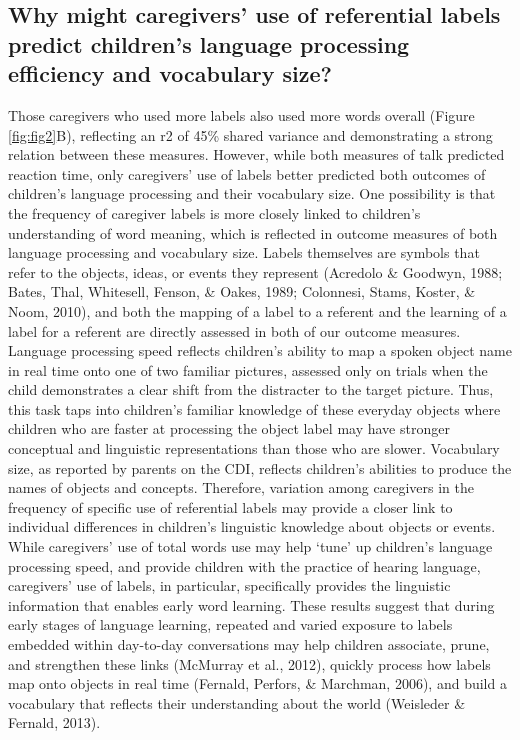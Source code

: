 \documentclass[
  man,mask,floatsintext]{apa6}
\begin{document}
\hypertarget{why-might-caregivers-use-of-referential-labels-predict-childrens-language-processing-efficiency-and-vocabulary-size}{%
\subsection{Why might caregivers' use of referential labels predict children's language processing efficiency and vocabulary size?}\label{why-might-caregivers-use-of-referential-labels-predict-childrens-language-processing-efficiency-and-vocabulary-size}}

Those caregivers who used more labels also used more words overall (Figure \ref{fig:fig2}B), reflecting an r2 of 45\% shared variance and demonstrating a strong relation between these measures. However, while both measures of talk predicted reaction time, only caregivers' use of labels better predicted both outcomes of children's language processing and their vocabulary size. One possibility is that the frequency of caregiver labels is more closely linked to children's understanding of word meaning, which is reflected in outcome measures of both language processing and vocabulary size. Labels themselves are symbols that refer to the objects, ideas, or events they represent (Acredolo \& Goodwyn, 1988; Bates, Thal, Whitesell, Fenson, \& Oakes, 1989; Colonnesi, Stams, Koster, \& Noom, 2010), and both the mapping of a label to a referent and the learning of a label for a referent are directly assessed in both of our outcome measures. Language processing speed reflects children's ability to map a spoken object name in real time onto one of two familiar pictures, assessed only on trials when the child demonstrates a clear shift from the distracter to the target picture. Thus, this task taps into children's familiar knowledge of these everyday objects where children who are faster at processing the object label may have stronger conceptual and linguistic representations than those who are slower. Vocabulary size, as reported by parents on the CDI, reflects children's abilities to produce the names of objects and concepts. Therefore, variation among caregivers in the frequency of specific use of referential labels may provide a closer link to individual differences in children's linguistic knowledge about objects or events. While caregivers' use of total words use may help `tune' up children's language processing speed, and provide children with the practice of hearing language, caregivers' use of labels, in particular, specifically provides the linguistic information that enables early word learning. These results suggest that during early stages of language learning, repeated and varied exposure to labels embedded within day-to-day conversations may help children associate, prune, and strengthen these links (McMurray et al., 2012), quickly process how labels map onto objects in real time (Fernald, Perfors, \& Marchman, 2006), and build a vocabulary that reflects their understanding about the world (Weisleder \& Fernald, 2013).
\end{document}
